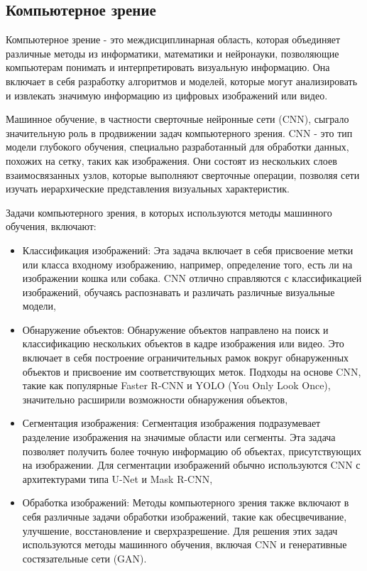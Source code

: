 \subsection{Компьютерное зрение}

Компьютерное зрение - это междисциплинарная область, которая объединяет различные методы из информатики, математики и нейронауки, позволяющие компьютерам понимать и интерпретировать визуальную информацию. Она включает в себя разработку алгоритмов и моделей, которые могут анализировать и извлекать значимую информацию из цифровых изображений или видео.

Машинное обучение, в частности сверточные нейронные сети (CNN), сыграло значительную роль в продвижении задач компьютерного зрения. CNN - это тип модели глубокого обучения, специально разработанный для обработки данных, похожих на сетку, таких как изображения. Они состоят из нескольких слоев взаимосвязанных узлов, которые выполняют сверточные операции, позволяя сети изучать иерархические представления визуальных характеристик.

Задачи компьютерного зрения, в которых используются методы машинного обучения, включают:

\begin{itemize}
    \item Классификация изображений: Эта задача включает в себя присвоение метки или класса входному изображению, например, определение того, есть ли на изображении кошка или собака. CNN отлично справляются с классификацией изображений, обучаясь распознавать и различать различные визуальные модели,
    \item Обнаружение объектов: Обнаружение объектов направлено на поиск и классификацию нескольких объектов в кадре изображения или видео. Это включает в себя построение ограничительных рамок вокруг обнаруженных объектов и присвоение им соответствующих меток. Подходы на основе CNN, такие как популярные Faster R-CNN и YOLO (You Only Look Once), значительно расширили возможности обнаружения объектов,
    \item Сегментация изображения: Сегментация изображения подразумевает разделение изображения на значимые области или сегменты. Эта задача позволяет получить более точную информацию об объектах, присутствующих на изображении. Для сегментации изображений обычно используются CNN с архитектурами типа U-Net и Mask R-CNN,
    \item Обработка изображений: Методы компьютерного зрения также включают в себя различные задачи обработки изображений, такие как обесцвечивание, улучшение, восстановление и сверхразрешение. Для решения этих задач используются методы машинного обучения, включая CNN и генеративные состязательные сети (GAN).
\end{itemize}

